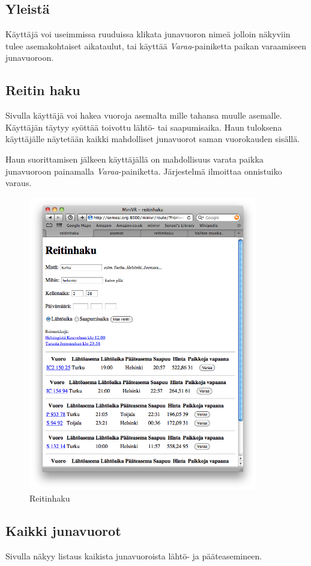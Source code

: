 \documentclass[a4paper,twoside,titlepage,12pt]{article}
\begin{document}
\subsection{Yleistä}
Käyttäjä voi useimmissa ruuduissa klikata junavuoron nimeä jolloin näkyviin tulee asemakohtaiset aikataulut, tai käyttää \emph{Varaa}-painiketta paikan varaamiseen junavuoroon.

\subsection{Reitin haku}
Sivulla käyttäjä voi hakea vuoroja asemalta mille tahansa muulle asemalle. Käyttäjän täytyy syöttää toivottu lähtö- tai saapumisaika. Haun tuloksena käyttäjälle näytetään kaikki mahdolliset junavuorot saman vuorokauden sisällä.

Haun suorittamisen jälkeen käyttäjällä on mahdollisuus varata paikka junavuoroon painamalla \emph{Varaa}-painiketta. Järjestelmä ilmoittaa onnistuiko varaus.

\begin{figure}
  \includegraphics[width=100mm]{route.png}
  \caption{Reitinhaku}
\end{figure}

\subsection{Kaikki junavuorot}
Sivulla näkyy listaus kaikista junavuoroista lähtö- ja pääteasemineen.
\end{document}
